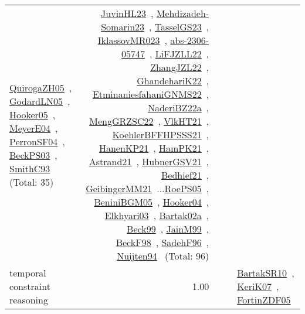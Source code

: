 {\begin{longtable}{p{3cm}r>{\raggedright\arraybackslash}p{6cm}>{\raggedright\arraybackslash}p{6cm}>{\raggedright\arraybackslash}p{8cm}}
\href{../works/QuirogaZH05.pdf}{QuirogaZH05}~\cite{QuirogaZH05}, \href{../works/GodardLN05.pdf}{GodardLN05}~\cite{GodardLN05}, \href{../works/Hooker05.pdf}{Hooker05}~\cite{Hooker05}, \href{../works/MeyerE04.pdf}{MeyerE04}~\cite{MeyerE04}, \href{../works/PerronSF04.pdf}{PerronSF04}~\cite{PerronSF04}, \href{../works/BeckPS03.pdf}{BeckPS03}~\cite{BeckPS03}, \href{../works/SmithC93.pdf}{SmithC93}~\cite{SmithC93} (Total: 35) & \href{../works/JuvinHL23.pdf}{JuvinHL23}~\cite{JuvinHL23}, \href{../works/Mehdizadeh-Somarin23.pdf}{Mehdizadeh-Somarin23}~\cite{Mehdizadeh-Somarin23}, \href{../works/TasselGS23.pdf}{TasselGS23}~\cite{TasselGS23}, \href{../works/IklassovMR023.pdf}{IklassovMR023}~\cite{IklassovMR023}, \href{../works/abs-2306-05747.pdf}{abs-2306-05747}~\cite{abs-2306-05747}, \href{../works/LiFJZLL22.pdf}{LiFJZLL22}~\cite{LiFJZLL22}, \href{../works/ZhangJZL22.pdf}{ZhangJZL22}~\cite{ZhangJZL22}, \href{../works/GhandehariK22.pdf}{GhandehariK22}~\cite{GhandehariK22}, \href{../works/EtminaniesfahaniGNMS22.pdf}{EtminaniesfahaniGNMS22}~\cite{EtminaniesfahaniGNMS22}, \href{../works/NaderiBZ22a.pdf}{NaderiBZ22a}~\cite{NaderiBZ22a}, \href{../works/MengGRZSC22.pdf}{MengGRZSC22}~\cite{MengGRZSC22}, \href{../works/VlkHT21.pdf}{VlkHT21}~\cite{VlkHT21}, \href{../works/KoehlerBFFHPSSS21.pdf}{KoehlerBFFHPSSS21}~\cite{KoehlerBFFHPSSS21}, \href{../works/HanenKP21.pdf}{HanenKP21}~\cite{HanenKP21}, \href{../works/HamPK21.pdf}{HamPK21}~\cite{HamPK21}, \href{../works/Astrand21.pdf}{Astrand21}~\cite{Astrand21}, \href{../works/HubnerGSV21.pdf}{HubnerGSV21}~\cite{HubnerGSV21}, \href{../works/Bedhief21.pdf}{Bedhief21}~\cite{Bedhief21}, \href{../works/GeibingerMM21.pdf}{GeibingerMM21}~\cite{GeibingerMM21}...\href{../works/RoePS05.pdf}{RoePS05}~\cite{RoePS05}, \href{../works/BeniniBGM05.pdf}{BeniniBGM05}~\cite{BeniniBGM05}, \href{../works/Hooker04.pdf}{Hooker04}~\cite{Hooker04}, \href{../works/Elkhyari03.pdf}{Elkhyari03}~\cite{Elkhyari03}, \href{../works/Bartak02a.pdf}{Bartak02a}~\cite{Bartak02a}, \href{../works/Beck99.pdf}{Beck99}~\cite{Beck99}, \href{../works/JainM99.pdf}{JainM99}~\cite{JainM99}, \href{../works/BeckF98.pdf}{BeckF98}~\cite{BeckF98}, \href{../works/SadehF96.pdf}{SadehF96}~\cite{SadehF96}, \href{../works/Nuijten94.pdf}{Nuijten94}~\cite{Nuijten94} (Total: 96)\\
\index{temporal constraint reasoning}\index{Concepts!temporal constraint reasoning}temporal constraint reasoning &  1.00 &  &  & \href{../works/BartakSR10.pdf}{BartakSR10}~\cite{BartakSR10}, \href{../works/KeriK07.pdf}{KeriK07}~\cite{KeriK07}, \href{../works/FortinZDF05.pdf}{FortinZDF05}~\cite{FortinZDF05}\\

\end{longtable}}
